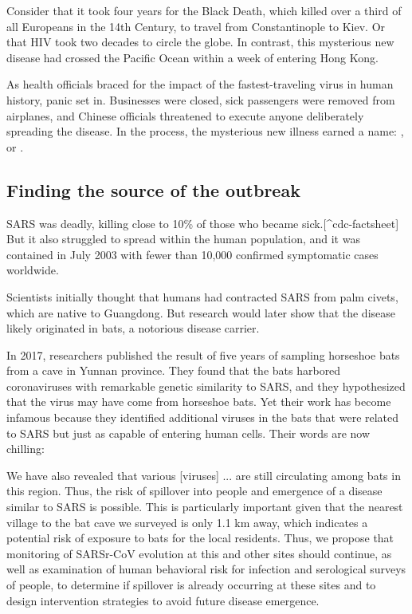 Consider that it took four years for the Black Death, which killed over a third of all Europeans in the 14th Century, to travel from Constantinople to Kiev. Or that HIV took two decades to circle the globe. In contrast, this mysterious new disease had crossed the Pacific Ocean within a week of entering Hong Kong.

As health officials braced for the impact of the fastest-traveling virus in human history, panic set in. Businesses were closed, sick passengers were removed from airplanes, and Chinese officials threatened to execute anyone deliberately spreading the disease. In the process, the mysterious new illness earned a name: , or .

\FloatBarrier
{}
\subsection{Finding the source of the outbreak}

SARS was deadly, killing close to 10\% of those who became sick.[^cdc-factsheet] But it also struggled to spread within the human population, and it was contained in July 2003 with fewer than 10,000 confirmed symptomatic cases worldwide.

Scientists initially thought that humans had contracted SARS from palm civets, which are native to Guangdong. But research would later show that the disease likely originated in bats, a notorious disease carrier.

In 2017, researchers published the result of five years of sampling horseshoe bats from a cave in Yunnan province. They found that the bats harbored coronaviruses with remarkable genetic similarity to SARS, and they hypothesized that the virus may have come from horseshoe bats. Yet their work has become infamous because they identified additional viruses in the bats that were related to SARS but just as capable of entering human cells. Their words are now chilling:

\begin{displayquote}
	We have also revealed that various [viruses] ... are still circulating among bats in this region. Thus, the risk of spillover into people and emergence of a disease similar to SARS is possible. This is particularly important given that the nearest village to the bat cave we surveyed is only 1.1 km away, which indicates a potential risk of exposure to bats for the local residents. Thus, we propose that monitoring of SARSr-CoV evolution at this and other sites should continue, as well as examination of human behavioral risk for infection and serological surveys of people, to determine if spillover is already occurring at these sites and to design intervention strategies to avoid future disease emergence.
\end{displayquote}

